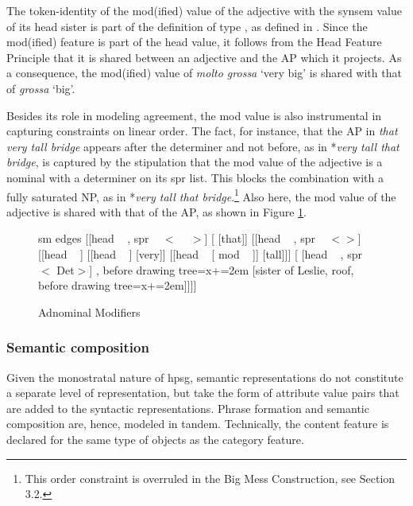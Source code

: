 \documentclass[output=paper]{langsci/langscibook}
\begin{document}
\noindent
The token-identity of the {\sc mod(ified)} value of the adjective
with the {\sc synsem} value of its head sister is part of the 
definition of type , as defined in . 
Since the {\sc mod(ified)} feature is part of the {\sc head} value, it follows from the 
Head Feature Principle that it is shared between an adjective 
and the AP which it projects. As a consequence, the {\sc mod(ified)} value of 
\emph{molto grossa} `very big' is shared with that of \emph{grossa} `big'. 
 
Besides its role in modeling agreement, the {\sc mod} value is also instrumental 
in capturing constraints on linear order.  
The fact, for instance, that the AP in \emph{that very tall bridge} appears 
after the determiner and not before, as in *\emph{very tall that bridge},
is captured by the stipulation that the {\sc mod} value of the adjective 
is a nominal with a determiner on its {\sc spr} list. This blocks the 
combination with a fully saturated NP, as in 
*\emph{very tall that bridge}.\footnote{This order constraint is overruled in 
the Big Mess Construction, see Section 3.2.} Also here, the {\sc mod} value of 
the adjective is shared with that of the AP, as shown in Figure \ref{lea}. 

\begin{figure}
	\centering
	\begin{forest}
sm edges
[{[{\sc head} ~   , {\sc spr} ~ $<$ ~ $>$]}
	[ [that]]
	[{[{\sc head} ~  , {\sc spr} ~ $<$$>$]}
		[{[{\sc head} ~ ]}
			[{[{\sc head} ~ ]} [very]]
			[{[{\sc head} ~  [ {\sc mod} ~ ]]} [tall]]]
		[{ [{\sc head} ~  , {\sc spr} ~ $<$ Det$>$]} , before drawing tree={x+=2em} [sister of Leslie, roof, before drawing tree={x+=2em}]]]]
	\end{forest}
	\caption{\label{lea} Adnominal Modifiers}
\end{figure}
 

\subsubsection{Semantic composition}


Given the monostratal nature of {\sc hpsg}, semantic representations 
do not constitute a separate level of representation, but take the form 
of attribute value pairs that are added to the syntactic representations.   
Phrase formation and semantic composition are, hence, modeled in tandem.  
Technically, the {\sc content} feature is declared for the same type of objects 
as the {\sc category} feature. 
\end{document}
